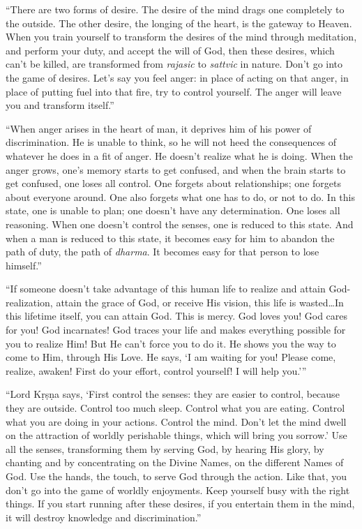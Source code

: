 \enquote{There are two forms of desire. The desire of the mind drags one completely to the outside. The other desire, the longing of the heart, is the gateway to Heaven. When you train yourself to transform the desires of the mind through meditation, and perform your duty, and accept the will of God, then these desires, which can’t be killed, are transformed from \textit{rajasic} to \textit{sattvic} in nature. Don’t go into the game of desires. Let’s say you feel anger: in place of acting on that anger, in place of putting fuel into that fire, try to control yourself. The anger will leave you and transform itself.}

\enquote{When anger arises in the heart of man, it deprives him of his power of discrimination. He is unable to think, so he will not heed the consequences of whatever he does in a fit of anger. He doesn’t realize what he is doing. When the anger grows, one’s memory starts to get confused, and when the brain starts to get confused, one loses all control. One forgets about relationships; one forgets about everyone around. One also forgets what one has to do, or not to do. In this state, one is unable to plan; one doesn’t have any determination. One loses all reasoning. When one doesn’t control the senses, one is reduced to this state. And when a man is reduced to this state, it becomes easy for him to abandon the path of duty, the path of \textit{dharma}. It becomes easy for that person to lose himself.}

\enquote{If someone doesn’t take advantage of this human life to realize and attain God-realization, attain the grace of God, or receive His vision, this life is wasted\ldots In this lifetime itself, you can attain God. This is mercy. God loves you! God cares for you! God incarnates! God traces your life and makes everything possible for you to realize Him! But He can’t force you to do it. He shows you the way to come to Him, through His Love. He says, \enquote{I am waiting for you! Please come, realize, awaken! First do your effort, control yourself! I will help you.}}

\enquote{Lord Kṛṣṇa says, \enquote{First control the senses: they are easier to control, because they are outside. Control too much sleep. Control what you are eating. Control what you are doing in your actions. Control the mind. Don’t let the mind dwell on the attraction of worldly perishable things, which will bring you sorrow.} Use all the senses, transforming them by serving God, by hearing His glory, by chanting and by concentrating on the Divine Names, on the different Names of God. Use the hands, the touch, to serve God through the action. Like that, you don’t go into the game of worldly enjoyments. Keep yourself busy with the right things. If you start running after these desires, if you entertain them in the mind, it will destroy knowledge and discrimination.}

